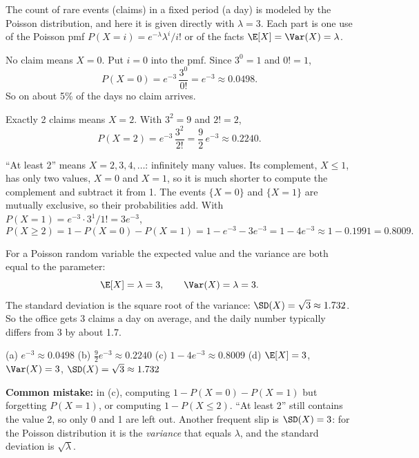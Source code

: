 \begin{solution}
	\idea The count of rare events (claims) in a fixed period (a day) is
	modeled by the Poisson distribution, and here it is given directly with
	$\lambda=3$. Each part is one use of the Poisson pmf
	$P(X=i)=e^{-\lambda}\lambda^i/i!$ or of the facts
	$\E[X]=\Var(X)=\lambda$.

	 No claim means $X=0$. Put $i=0$ into the pmf. Since
	$3^0=1$ and $0!=1$,
	\[ P(X=0)=e^{-3}\,\frac{3^0}{0!}=e^{-3}\approx0.0498. \]
	So on about 5\% of the days no claim arrives.

	 Exactly 2 claims means $X=2$. With $3^2=9$ and $2!=2$,
	\[ P(X=2)=e^{-3}\,\frac{3^2}{2!}=\frac92\,e^{-3}\approx0.2240. \]

	 ``At least 2'' means $X=2,3,4,\dots$: infinitely many values.
	Its complement, $X\le1$, has only two values, $X=0$ and $X=1$, so it is
	much shorter to compute the complement and subtract it from 1. The events
	$\{X=0\}$ and $\{X=1\}$ are mutually exclusive, so their probabilities
	add. With $P(X=1)=e^{-3}\cdot3^1/1!=3e^{-3}$,
	\[ P(X\ge2)=1-P(X=0)-P(X=1)=1-e^{-3}-3e^{-3}=1-4e^{-3}\approx1-0.1991
		=0.8009. \]

	 For a Poisson random variable the expected value and the
	variance are both equal to the parameter:
	\[ \E[X]=\lambda=3,\qquad \Var(X)=\lambda=3. \]
	The standard deviation is the square root of the variance:
	$\SD(X)=\sqrt3\approx1.732$. So the office gets 3 claims a day on
	average, and the daily number typically differs from 3 by about 1.7.
	\begin{answer}
		(a) $e^{-3}\approx0.0498$ \quad
		(b) $\frac92e^{-3}\approx0.2240$ \quad
		(c) $1-4e^{-3}\approx0.8009$ \quad
		(d) $\E[X]=3$, $\Var(X)=3$, $\SD(X)=\sqrt3\approx1.732$
	\end{answer}
	\begin{remark}
		\textbf{Common mistake:} in (c), computing $1-P(X=0)-P(X=1)$ but
		forgetting $P(X=1)$, or computing $1-P(X\le2)$. ``At least 2'' still
		contains the value 2, so only 0 and 1 are left out. Another frequent slip
		is $\SD(X)=3$: for the Poisson distribution it is the \emph{variance}
		that equals $\lambda$, and the standard deviation is $\sqrt\lambda$.
	\end{remark}
\end{solution}
